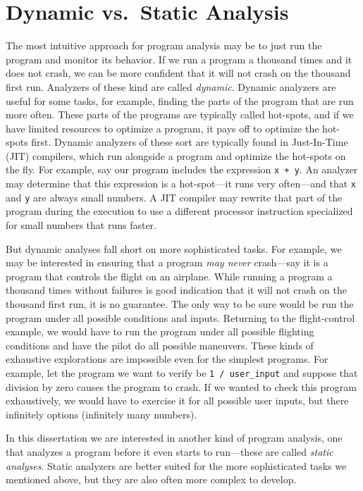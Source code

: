 \documentclass[12pt, oneside]{book}
\begin{document}
\section{Dynamic vs.\ Static Analysis}

The most intuitive approach for program analysis may be to just run the program and monitor its behavior. If we run a program a thousand times and it does not crash, we can be more confident that it will not crash on the thousand first run. Analyzers of these kind are called \emph{dynamic}. Dynamic analyzers are useful for some tasks, for example, finding the parts of the program that are run more often. These parts of the programs are typically called hot-spots, and if we have limited resources to optimize a program, it pays off to optimize the hot-spots first. Dynamic analyzers of these sort are typically found in Just-In-Time (JIT) compilers, which run alongside a program and optimize the hot-spots on the fly. For example, say our program includes the expression \texttt{x + y}. An analyzer may determine that this expression is a hot-spot—it runs very often—and that \texttt{x} and \texttt{y} are always small numbers. A JIT compiler may rewrite that part of the program during the execution to use a different processor instruction specialized for small numbers that runs faster.

But dynamic analyses fall short on more sophisticated tasks. For example, we may be interested in ensuring that a program \emph{may never} crash—say it is a program that controls the flight on an airplane. While running a program a thousand times without failures is good indication that it will not crash on the thousand first run, it is no guarantee. The only way to be sure would be run the program under all possible conditions and inputs. Returning to the flight-control example, we would have to run the program under all possible flighting conditions and have the pilot do all possible maneuvers. These kinds of exhaustive explorations are impossible even for the simplest programs. For example, let the program we want to verify be \texttt{1 / user\_input} and suppose that division by zero causes the program to crash. If we wanted to check this program exhaustively, we would have to exercise it for all possible user inputs, but there infinitely options (infinitely many numbers).

In this dissertation we are interested in another kind of program analysis, one that analyzes a program before it even starts to run—these are called \emph{static analyses}. Static analyzers are better suited for the more sophisticated tasks we mentioned above, but they are also often more complex to develop.
\end{document}

